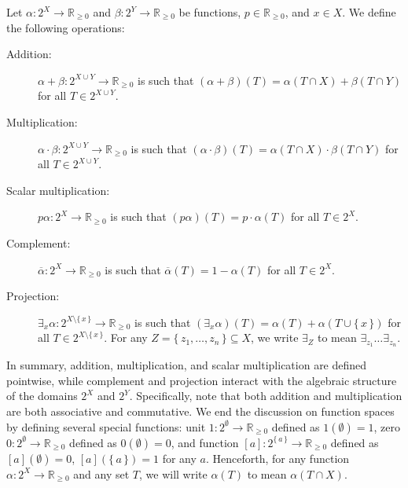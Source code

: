 \begin{definition}
  Let $\alpha\colon 2^X \to \mathbb{R}_{\ge 0}$ and
  $\beta\colon 2^Y \to \mathbb{R}_{\ge 0}$ be functions,
  $p \in \mathbb{R}_{\ge 0}$, and $x \in X$. We define the following operations:
  \begin{description}
    \item[Addition:] $\alpha + \beta\colon 2^{X \cup Y} \to \mathbb{R}_{\ge 0}$ is
          such that $(\alpha + \beta)(T) = \alpha(T \cap X) + \beta(T \cap Y)$ for all
          $T \in 2^{X \cup Y}$.
    \item[Multiplication:] $\alpha \cdot \beta\colon 2^{X \cup Y} \to
          \mathbb{R}_{\ge 0}$ is such that $(\alpha \cdot \beta)(T) = \alpha(T \cap X)
          \cdot \beta(T \cap Y)$ for all $T \in 2^{X \cup Y}$.
    \item[Scalar multiplication:] $p\alpha\colon 2^X \to \mathbb{R}_{\ge 0}$ is
          such that $(p\alpha)(T) = p \cdot \alpha(T)$ for all $T \in 2^X$.
    \item[Complement:] $\overline{\alpha}\colon 2^X \to \mathbb{R}_{\ge 0}$ is
          such that $\overline{\alpha}(T) = 1 - \alpha(T)$ for all $T \in 2^X$.
    \item[Projection:] $\exists_x\alpha\colon 2^{X \setminus \{\, x \,\}} \to
          \mathbb{R}_{\ge 0}$ is such that $(\exists_x\alpha)(T) = \alpha(T) +
          \alpha(T \cup \{\, x \,\})$ for all $T \in 2^{X \setminus \{\, x \,\}}$. For any $Z =
          \{\, z_1, \dots, z_n \,\} \subseteq X$, we write $\exists_Z$ to mean
          $\exists_{z_1}\dots\exists_{z_n}$.
  \end{description}
\end{definition}

In summary, addition, multiplication, and scalar multiplication are defined
pointwise, while complement and projection interact with the algebraic structure
of the domains $2^X$ and $2^Y$. Specifically, note that both addition and
multiplication are both associative and commutative. We end the discussion on
function spaces by defining several special functions: unit
$1\colon 2^\emptyset \to \mathbb{R}_{\ge 0}$ defined as $1(\emptyset) = 1$, zero
$0\colon 2^\emptyset \to \mathbb{R}_{\ge 0}$ defined as $0(\emptyset) = 0$, and
function $[a]\colon 2^{\{\, a \,\}} \to \mathbb{R}_{\ge 0}$ defined as
$[a](\emptyset) = 0$, $[a](\{\, a \,\}) = 1$ for any $a$. Henceforth, for any
function $\alpha\colon 2^X \to \mathbb{R}_{\ge 0}$ and any set $T$, we will
write $\alpha(T)$ to mean $\alpha(T \cap X)$.

